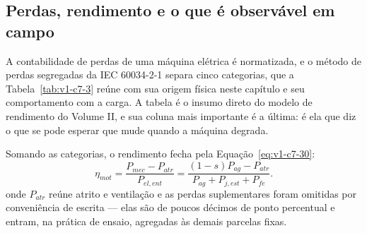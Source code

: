 \documentclass[12pt,a4paper]{article}
\numberwithin{equation}{section}
\numberwithin{table}{section}
\numberwithin{figure}{section}
\begin{document}
\subsection{Perdas, rendimento e o que é observável em
campo}\label{sub:v1-c7-perdas}

A contabilidade de perdas de uma máquina elétrica é normatizada, e o método de
perdas segregadas da IEC 60034-2-1 \cite{iec60034} separa cinco categorias, que
a Tabela~\ref{tab:v1-c7-3} reúne com sua origem física neste capítulo e seu
comportamento com a carga. A tabela é o insumo direto do modelo de rendimento
do Volume II, e sua coluna mais importante é a última: é ela que diz o que se
pode esperar que mude quando a máquina degrada.

\begin{table}[H]
\centering
\caption[Perdas segregadas de máquina de indução]{Categorias de perda da
IEC 60034-2-1, origem física neste capítulo e dependência da carga.}
\label{tab:v1-c7-3}
\small
{}
\end{table}

Somando as categorias, o rendimento fecha pela
Equação~\eqref{eq:v1-c7-30}:
\begin{equation}\label{eq:v1-c7-30}
\eta_{mot} = \frac{P_{mec} - P_{atr}}{P_{el,ent}}
= \frac{(1-s)P_{ag} - P_{atr}}{P_{ag} + P_{j,est} + P_{fe}} .
\end{equation}
onde $P_{atr}$ reúne atrito e ventilação e as perdas suplementares foram
omitidas por conveniência de escrita --- elas são de poucos décimos de ponto
percentual e entram, na prática de ensaio, agregadas às demais parcelas fixas.
\end{document}
